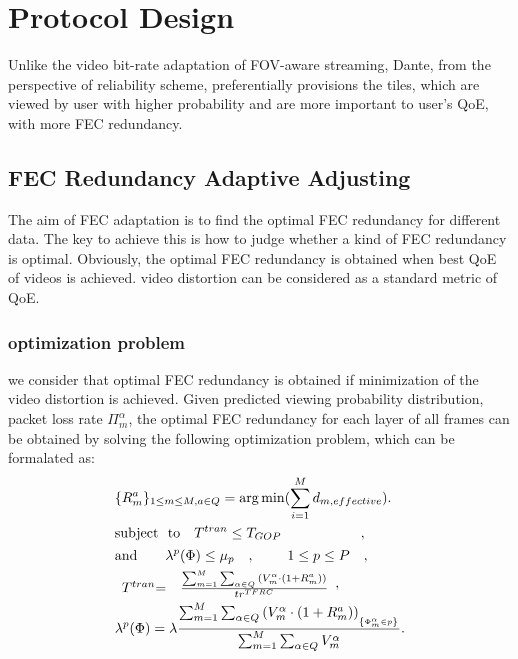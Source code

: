 
\section{Protocol Design}
Unlike the video bit-rate adaptation of FOV-aware streaming, Dante, from the perspective of reliability scheme, preferentially provisions the tiles, which are viewed by user with higher probability and are more important to user's QoE, with more FEC redundancy.  


\subsection{FEC Redundancy Adaptive Adjusting}
The aim of FEC adaptation is to find the optimal FEC redundancy for different data. The key to achieve this is how to judge whether a kind of FEC redundancy is optimal. Obviously, the optimal FEC redundancy is obtained when best QoE of videos is achieved.  video distortion can be considered as a standard metric of QoE. 

\subsubsection{optimization problem}

we consider that optimal FEC redundancy is obtained if minimization of the video distortion is achieved.
Given predicted viewing probability distribution, packet loss rate $\Pi _m^\alpha$, the optimal FEC redundancy for each layer of all frames can be obtained by solving the following optimization problem, which can be formalated as:
\begin{eqnarray}
&{\{ R_m^a\} _{1 \le m \le M,a \in Q}} = \arg \min (\sum\limits_{i = 1}^M {d_{m,effective}}).  \\
&{\rm{subject}}{~~\rm{to}}{~~~T^{tran}} \le {T_{GOP}}~~~~~~~~~~~~~~~~~, \\
&{\rm{and}}{~~~~~~\lambda ^p}(\Phi ) \le {\mu _p}\begin{array}{*{20}{c}}
{}
\end{array}{\rm{}},{\rm{}}~~~~~~~1 \le p \le P~~~,\\
&\begin{array}{*{20}{c}}
{{T^{tran}}{\rm{ = }}}&{\frac{{\sum\nolimits_{m = 1}^M {\sum\nolimits_{\alpha  \in Q} {(V_m^\alpha  \cdot (1 + R_m^a))} } }}{{t{r^{TFRC}}}}}
\end{array},\\
&{\lambda ^p}(\Phi ) = \lambda \frac{{\sum\nolimits_{m = 1}^M {\sum\nolimits_{\alpha  \in Q} {{{(V_m^\alpha  \cdot (1 + R_m^a))}_{_{\left\{ {\Phi _m^\alpha  \in p} \right\}}}}} } }}{{\sum\nolimits_{m = 1}^M {\sum\nolimits_{\alpha  \in Q} {V_m^\alpha } } }}.
\end{eqnarray}

